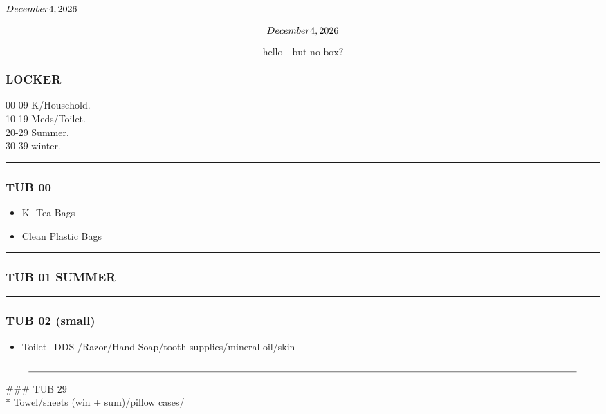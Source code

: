 \documentclass[
  10pt,
]{article}
\providecommand{\tightlist}{%
  \setlength{\itemsep}{0pt}\setlength{\parskip}{0pt}}
\begin{document}
\(\today\)

\[\today\]

\[\mbox{hello - but no box?}\]

\hypertarget{locker}{%
\subsubsection{LOCKER}\label{locker}}

00-09 K/Household.\\
10-19 Meds/Toilet.\\
20-29 Summer.\\
30-39 winter.

\begin{center}\rule{0.5\linewidth}{0.5pt}\end{center}

\hypertarget{tub-00}{%
\subsubsection{TUB 00}\label{tub-00}}

\begin{itemize}
\tightlist
\item
  K- Tea Bags
\item
  Clean Plastic Bags
\end{itemize}

\begin{center}\rule{0.5\linewidth}{0.5pt}\end{center}

\hypertarget{tub-01-summer}{%
\subsubsection{TUB 01 SUMMER}\label{tub-01-summer}}

\begin{center}\rule{0.5\linewidth}{0.5pt}\end{center}

\hypertarget{tub-02-small}{%
\subsubsection{TUB 02 (small)}\label{tub-02-small}}

\begin{itemize}
\tightlist
\item
  Toilet+DDS /Razor/Hand Soap/tooth supplies/mineral oil/skin
\end{itemize}

\[\noindent\rule{20cm}{0.4pt}\] \#\#\# TUB 29\\
* Towel/sheets (win + sum)/pillow cases/
\end{document}
